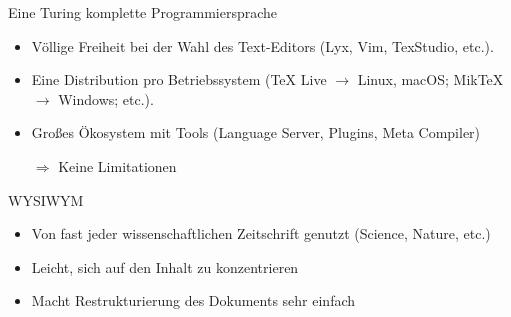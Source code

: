

\begin{frame}{Eine Turing komplette Programmiersprache}
	\begin{itemize}[<+-|alert@+>]
		\item Völlige Freiheit bei der Wahl des Text-Editors (Lyx, Vim, TexStudio, etc.).
		\item Eine Distribution pro Betriebssystem  (TeX Live $\rightarrow$ Linux, macOS; MikTeX $\rightarrow$ Windows; etc.).
		\item Großes Ökosystem mit Tools (Language Server, Plugins, Meta Compiler)
		\item[$\Rightarrow$] Keine Limitationen
	\end{itemize}
\end{frame}

\begin{frame}{WYSIWYM}
	\begin{itemize}[<+-|alert@+>]
		\item Von fast jeder wissenschaftlichen Zeitschrift genutzt (Science, Nature, etc.)
		\item Leicht, sich auf den Inhalt zu konzentrieren
        \item Macht Restrukturierung des Dokuments sehr einfach
	\end{itemize}
\end{frame}
